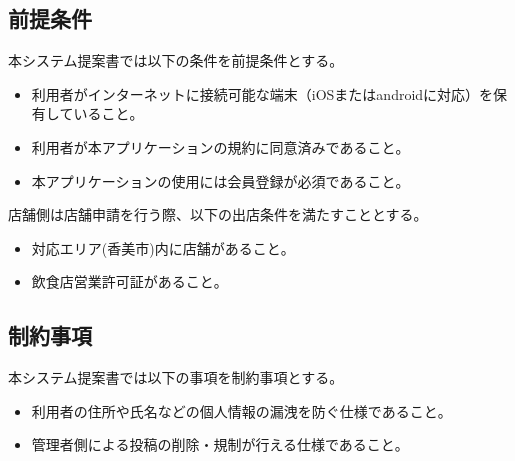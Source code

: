 \subsection{前提条件}
 本システム提案書では以下の条件を前提条件とする。

 \begin{itemize}
  \item 利用者がインターネットに接続可能な端末（iOSまたはandroidに対応）を保有していること。
  \item 利用者が本アプリケーションの規約に同意済みであること。
  \item 本アプリケーションの使用には会員登録が必須であること。
\end{itemize}

店舗側は店舗申請を行う際、以下の出店条件を満たすこととする。

\begin{itemize}
  \item 対応エリア(香美市)内に店舗があること。
  \item 飲食店営業許可証があること。
\end{itemize}

\subsection{制約事項}
本システム提案書では以下の事項を制約事項とする。
\begin{itemize}
    \item 利用者の住所や氏名などの個人情報の漏洩を防ぐ仕様であること。
    \item 管理者側による投稿の削除・規制が行える仕様であること。
\end{itemize}
